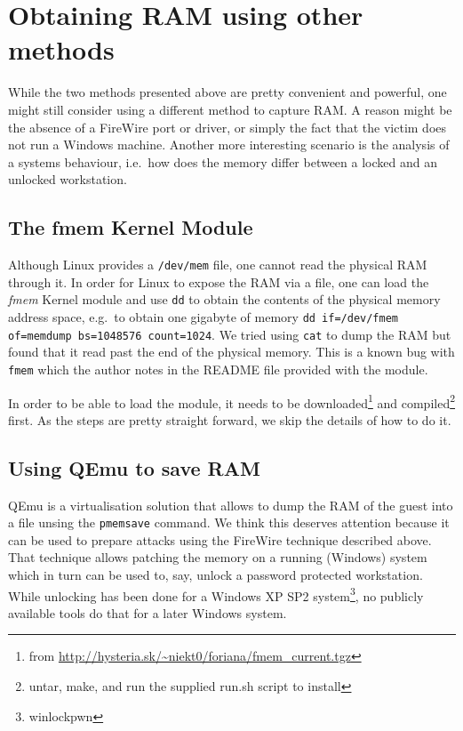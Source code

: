 \documentclass[a4paper,
    11pt,
    normalheadings,
    parindent,
    UKenglish,
    abstracton,
    ]{scrartcl}
\begin{document}
\section{Obtaining RAM using other methods}
While the two methods presented above are pretty convenient and powerful, one might still consider using a different method to capture RAM.
A reason might be the absence of a FireWire port or driver, or simply the fact that the victim does not run a Windows machine.
Another more interesting scenario is the analysis of a systems behaviour, i.e.\, how does the memory differ between a locked and an unlocked workstation.

\subsection{The fmem Kernel Module}
Although Linux provides a \texttt{/dev/mem} file, one cannot read the physical RAM through it.
In order for Linux to expose the RAM via a file, one can load the \emph{fmem} Kernel module and use \texttt{dd} to obtain the contents of the physical memory address space, e.g.\, to obtain one gigabyte of memory \texttt{dd if=/dev/fmem of=memdump bs=1048576 count=1024}.
We tried using \texttt{cat} to dump the RAM but found that it read past the end of the physical memory.
This is a known bug with \texttt{fmem} which the author notes in the README file provided with the module.


In order to be able to load the module, it needs to be downloaded\footnote{from \url{http://hysteria.sk/~niekt0/foriana/fmem_current.tgz}} and compiled\footnote{untar, make, and run the supplied run.sh script to install} first.
As the steps are pretty straight forward, we skip the details of how to do it.


\subsection{Using QEmu to save RAM}
QEmu is a virtualisation solution that allows to dump the RAM of the guest into a file unsing the \texttt{pmemsave} command.
We think this deserves attention because it can be used to prepare attacks using the FireWire technique described above.
That technique allows patching the memory on a running (Windows) system which in turn can be used to, say, unlock a password protected workstation.
While unlocking has been done for a Windows XP SP2 system\footnote{winlockpwn}, no publicly available tools do that for a later Windows system.
\end{document}
